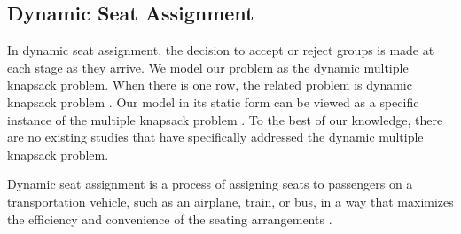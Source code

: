 





\subsection{Dynamic Seat Assignment}
In dynamic seat assignment, the decision to accept or reject groups is made at each stage as they arrive. We model our problem as the dynamic multiple knapsack problem. When there is one row, the related problem is dynamic knapsack problem \cite{kleywegt1998dynamic}. Our model in its static form can be viewed as a specific instance of the multiple knapsack problem \cite{pisinger1999exact}. To the best of our knowledge, there are no existing studies that have specifically addressed the dynamic multiple knapsack problem.

Dynamic seat assignment is a process of assigning seats to passengers on a transportation vehicle, such as an airplane, train, or bus, in a way that maximizes the efficiency and convenience of the seating arrangements \cite{hamdouch2011schedule, berge1993demand, zhu2023assign}. 




